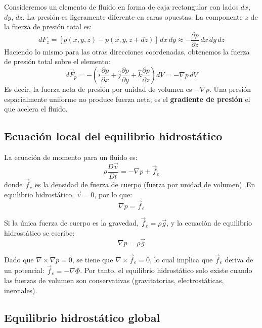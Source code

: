 Consideremos un elemento de fluido en forma de caja rectangular con lados $dx$, $dy$, $dz$. La presión es ligeramente diferente en caras opuestas. La componente $z$ de la fuerza de presión total es:
\begin{equation}
    dF_z = [p(x,y,z) - p(x,y,z+dz)]\,dx\,dy \approx -\frac{\partial p}{\partial z}\,dx\,dy\,dz
\end{equation}
Haciendo lo mismo para las otras direcciones coordenadas, obtenemos la fuerza de presión total sobre el elemento:
\begin{equation}
    d\vec{F}_p = -\left(\hat{i}\frac{\partial p}{\partial x} + \hat{j}\frac{\partial p}{\partial y} + \hat{k}\frac{\partial p}{\partial z}\right)dV = -\nabla p\, dV
\end{equation}
Es decir, la fuerza neta de presión por unidad de volumen es $-\nabla p$. Una presión espacialmente uniforme no produce fuerza neta; es el \textbf{gradiente de presión} el que acelera el fluido.

\subsection{Ecuación local del equilibrio hidrostático}

La ecuación de momento para un fluido es:
\begin{equation}
    \rho\frac{D\vec{v}}{Dt} = -\nabla p + \vec{f}_e
\end{equation}
donde $\vec{f}_e$ es la densidad de fuerza de cuerpo (fuerza por unidad de volumen). En equilibrio hidrostático, $\vec{v} = 0$, por lo que:
\begin{equation}
    \boxed{\nabla p = \vec{f}_e}
\end{equation}

Si la única fuerza de cuerpo es la gravedad, $\vec{f}_e = \rho\vec{g}$, y la ecuación de equilibrio hidrostático se escribe:
\begin{equation}
    \boxed{\nabla p = \rho\vec{g}}
\end{equation}

Dado que $\nabla \times \nabla p = 0$, se tiene que $\nabla \times \vec{f}_e = 0$, lo cual implica que $\vec{f}_e$ deriva de un potencial: $\vec{f}_e = -\nabla\Phi$. Por tanto, el equilibrio hidrostático solo existe cuando las fuerzas de volumen son conservativas (gravitatorias, electrostáticas, inerciales).

\subsection{Equilibrio hidrostático global}

